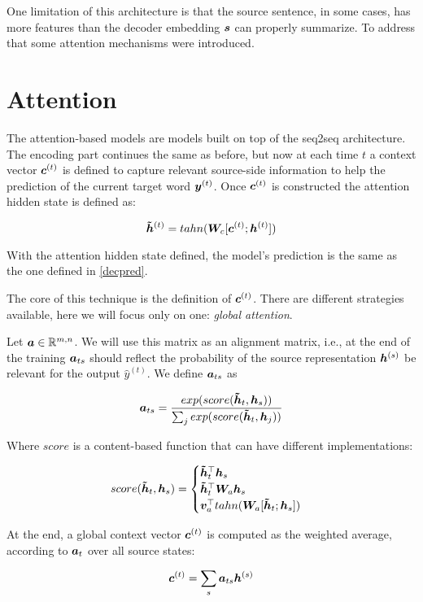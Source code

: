 One limitation of this architecture is that the source sentence, in some cases, has more features than the decoder embedding $\bm{s}$ can properly summarize. To address that some attention mechanisms were introduced.

\section{Attention}
\label{sec:Attention}

The attention-based models are models built on top of the seq2seq architecture. The encoding part continues the same as before, but now at each time $t$ a context vector $\bm{c}^{(t)}$ is defined to capture relevant source-side information to help the prediction of the current target word $\bm{y}^{(t)}$. Once $\bm{c}^{(t)}$ is constructed the attention hidden state is defined as:   

\begin{equation}
\bm{\tilde{h}}^{(t)} = tahn(\bm{W}_c[\bm{c}^{(t)};\bm{h}^{(t)}])
\end{equation}

With the attention hidden state defined, the model's prediction is the same as the one defined in \ref{decpred}.

The core of this technique is the definition of $\bm{c}^{(t)}$. There are different strategies available, here we will focus only on one: \textit{global attention}.

Let $\bm{a} \in \mathbb{R}^{m,n}$. We will use this matrix as an alignment matrix, i.e., at the end of the training $\bm{a}_{ts}$ should reflect the probability of the source representation $\bm{h}^{(s)}$ be relevant for the output $\hat{y}^{(t)}$. We define $\bm{a}_{ts}$ as


\begin{equation}
\bm{a}_{ts} = \frac{exp(score(\bm{\tilde{h}}_t,\bm{h}_s))}{\sum_j exp(score(\bm{\tilde{h}}_t,\bm{h}_j))}
\end{equation}

Where $score$ is a content-based function that can have different implementations: 

\begin{equation}
score(\bm{\tilde{h}}_t,\bm{h}_s) = \begin{cases}
\bm{\tilde{h}}_t ^{\top}\bm{h}_s\\
\bm{\tilde{h}}_t ^{\top}\bm{W}_a \bm{h}_s\\
\bm{v}_a ^{\top}tahn(\bm{W}_a[\bm{\tilde{h}}_t;\bm{h}_s])\\
\end{cases}
\end{equation}

At the end, a global context vector $\bm{c}^{(t)}$ is computed as the weighted average, according to $\bm{a}_t$ over all source states:

\begin{equation}
\bm{c}^{(t)} = \sum_{s} \bm{a}_{ts}\bm{h}^{(s)}
\end{equation}



